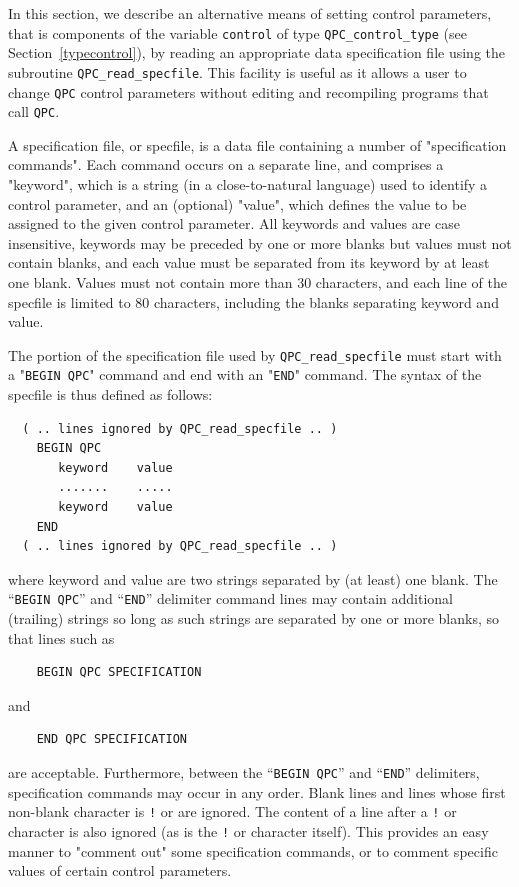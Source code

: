 \documentclass{galahad}
\newcommand{\packagename}{QPC}
\begin{document}

\galfeatures
\noindent In this section, we describe an alternative means of setting 
control parameters, that is components of the variable {\tt control} of type
{\tt \packagename\_control\_type}
(see Section~\ref{typecontrol}), 
by reading an appropriate data specification file using the
subroutine {\tt \packagename\_read\_specfile}. This facility
is useful as it allows a user to change  {\tt \packagename} control parameters 
without editing and recompiling programs that call {\tt \packagename}.

A specification file, or specfile, is a data file containing a number of 
"specification commands". Each command occurs on a separate line, 
and comprises a "keyword", 
which is a string (in a close-to-natural language) used to identify a 
control parameter, and 
an (optional) "value", which defines the value to be assigned to the given
control parameter. All keywords and values are case insensitive, 
keywords may be preceded by one or more blanks but
values must not contain blanks, and
each value must be separated from its keyword by at least one blank.
Values must not contain more than 30 characters, and 
each line of the specfile is limited to 80 characters,
including the blanks separating keyword and value.



The portion of the specification file used by 
{\tt \packagename\_read\_specfile}
must start
with a "{\tt BEGIN \packagename}" command and end with an 
"{\tt END}" command.  The syntax of the specfile is thus defined as follows:
\begin{verbatim}
  ( .. lines ignored by QPC_read_specfile .. )
    BEGIN QPC
       keyword    value
       .......    .....
       keyword    value
    END 
  ( .. lines ignored by QPC_read_specfile .. )
\end{verbatim}
where keyword and value are two strings separated by (at least) one blank.
The ``{\tt BEGIN \packagename}'' and ``{\tt END}'' delimiter command lines 
may contain additional (trailing) strings so long as such strings are 
separated by one or more blanks, so that lines such as
\begin{verbatim}
    BEGIN QPC SPECIFICATION
\end{verbatim}
and
\begin{verbatim}
    END QPC SPECIFICATION
\end{verbatim}
are acceptable. Furthermore, 
between the
``{\tt BEGIN \packagename}'' and ``{\tt END}'' delimiters,
specification commands may occur in any order.  Blank lines and
lines whose first non-blank character is {\tt !} or {\tt *} are ignored. 
The content 
of a line after a {\tt !} or {\tt *} character is also 
ignored (as is the {\tt !} or {\tt *}
character itself). This provides an easy manner to "comment out" some 
specification commands, or to comment specific values 
of certain control parameters.  
\end{document}
